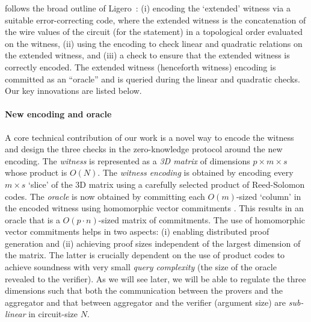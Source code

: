 \name{} follows the broad outline of Ligero~\cite{ligero}: 
(i) encoding the `extended' witness via a suitable error-correcting code, where the extended witness is the concatenation of the wire values of the circuit (for the statement) in a topological order evaluated on the witness, (ii) using the
encoding to check linear and quadratic relations on the extended
witness, and (iii) a check to ensure that the extended witness is correctly
encoded. The extended witness (henceforth witness) encoding is committed as an ``oracle'' and is queried
during the linear and quadratic checks.  Our key innovations are
listed below. 

\paragraph{New encoding and oracle} A core technical contribution of our
work is a novel way to encode the witness and design the three checks in
the zero-knowledge protocol around the new encoding. The \textit{witness} is
represented as a \textit{3D matrix} of dimensions $p \times m \times s$ whose
product is $O(N)$. The \textit{witness encoding} is obtained by encoding every
$m \times s$ `slice' of the 3D matrix using a carefully selected product of
Reed-Solomon codes.  The \textit{oracle} is now obtained by committing each $O(m)$-sized `column' in 
the encoded witness using homomorphic vector commitments \cite{Ped92}. 
This results in an oracle that is a $O(p \cdot n)$-sized matrix of commitments.
The use of homomorphic vector commitments helps in two aspects: (i) enabling
distributed proof generation and (ii) achieving proof sizes independent of the
largest dimension of the matrix. The latter is crucially dependent on the use
of product codes to achieve soundness with very small {\em query complexity} (the size of the
oracle revealed to the verifier).
As we will see later, we will be able to regulate the three dimensions such that
both the communication between the provers and the
aggregator and that between aggregator and the verifier (argument size) are 
{\em sub-linear} in circuit-size $N$. 

